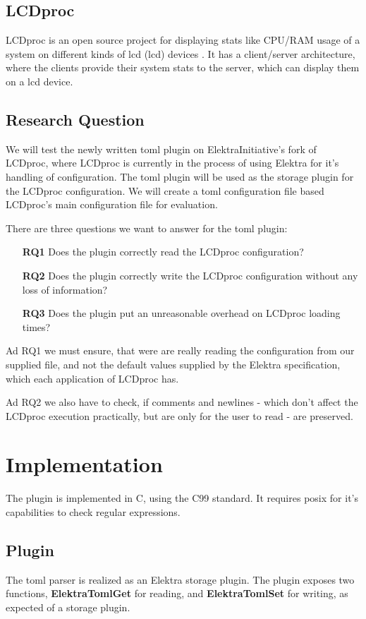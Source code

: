 \documentclass[12pt]{report}
\begin{document}
\section{LCDproc}
LCDproc is an open source project for displaying stats like CPU/RAM usage of a system on different kinds of \acrshort{lcd} (\acrlong{lcd}) devices \cite{LCDprocmain}\cite{LCDprocgit}.
It has a client/server architecture, where the clients provide their system stats to the server, which can display them on a \acrshort{lcd} device.

\section{Research Question}
We will test the newly written toml plugin on ElektraInitiative's fork of LCDproc, where LCDproc is currently in the process of using Elektra for it's handling of configuration.
The toml plugin will be used as the storage plugin for the LCDproc configuration.
We will create a \acrshort{toml} configuration file based LCDproc's main configuration file for evaluation.

There are three questions we want to answer for the toml plugin:
\begin{itemize}
	\item[\textbf{RQ1}] Does the plugin correctly read the LCDproc configuration?
	\item[\textbf{RQ2}] Does the plugin correctly write the LCDproc configuration without any loss of information?
	\item[\textbf{RQ3}] Does the plugin put an unreasonable overhead on LCDproc loading times?
\end{itemize}
Ad RQ1 we must ensure, that were are really reading the configuration from our supplied file, and not the default values supplied by the Elektra specification, which each application of LCDproc has.

Ad RQ2 we also have to check, if comments and newlines - which don't affect the LCDproc execution practically, but are only for the user to read - are preserved.

\chapter{Implementation}

The plugin is implemented in C, using the C99 standard. It requires \acrshort{posix} for it's capabilities to check regular expressions.

\section{Plugin}
The toml parser is realized as an Elektra storage plugin. The plugin exposes two functions, \textbf{ElektraTomlGet} for reading, and \textbf{ElektraTomlSet} for writing, as expected of a storage plugin.
\end{document}
